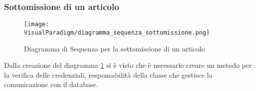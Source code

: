 \subsubsection{Sottomissione di un articolo}
\label{sec:sequenza_sottomissione}
\begin{figure}[ht]
  \centering
  \texttt{[image: VisualParadigm/diagramma\_sequenza\_sottomissione.png]}
  \caption{Diagramma di Sequenza per la sottomissione di un articolo}
  \label{fig:sottomissione}
\end{figure}

Dalla creazione del diagramma \ref{fig:sottomissione} si è visto che è
necessario creare un metodo per la verifica delle credenziali,
responsabilità della classe che gestisce la comunicazione con il
database.
